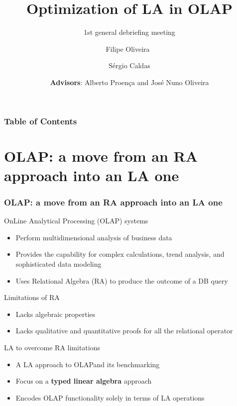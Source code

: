 \documentclass{beamer}
\title{Optimization of LA in OLAP}
\subtitle{1st general debriefing meeting}
\author{ Filipe Oliveira\ \and Sérgio Caldas}
\date[UMinho, April 2016] %
  { \scriptsize \break \break \break \break 
\textbf{Advisors}: Alberto Proença and José Nuno Oliveira }
\begin{document}
\begin{frame}
  \titlepage
\end{frame}

\begin{frame}
\frametitle{Table of Contents}
\tableofcontents
\end{frame}

\section{OLAP: a move from  an RA approach into an LA one}
\begin{frame}
\frametitle{OLAP: a move from  an RA approach into an LA one}


\begin{block}{OnLine Analytical Processing (OLAP) systems}

\begin{itemize}
    \item Perform multidimensional analysis of business data
    \item Provides the capability for complex calculations, trend analysis, and sophisticated data modeling
    \item Uses Relational Algebra (RA) to produce the outcome of a DB query
\end{itemize}
\end{block}

\begin{alertblock}{Limitations of RA}
\footnotesize
\begin{itemize}
    \item Lacks algebraic properties
    \item Lacks qualitative and quantitative proofs for all the relational operator
\end{itemize}
\end{alertblock}

\begin{block}{LA to overcome RA limitations}
\begin{itemize}
    \item A LA approach to OLAP\footnotemark[1] and its benchmarking\footnotemark[2]
    \item Focus on a \textbf{typed linear algebra} approach
    \item Encodes OLAP functionality solely in terms of LA operations
    
\end{itemize}
\end{block}
\tiny{

}
\break
\tiny{
}
\end{frame}
\end{document}
